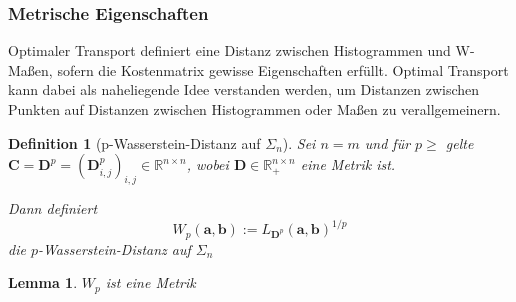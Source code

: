 \documentclass[11pt,a4paper]{article}
\newtheorem{lemma}[theorem]{Lemma}
\newtheorem{definition}[theorem]{Definition}
\numberwithin{equation}{section}
\begin{document}
	
	\subsubsection{Metrische Eigenschaften}
	Optimaler Transport definiert eine Distanz zwischen Histogrammen und W-Maßen, sofern die Kostenmatrix gewisse Eigenschaften erfüllt. Optimal Transport kann dabei als naheliegende Idee verstanden werden, um Distanzen zwischen Punkten auf Distanzen zwischen Histogrammen oder Maßen zu verallgemeinern.
	
	\begin{definition}[p-Wasserstein-Distanz auf $\Sigma_n$]
		Sei $n=m$ und für $p \geq$ gelte $\boldsymbol{C} = \boldsymbol{D}^p = (\boldsymbol{D}_{i,j}^p)_{i,j} \in \mathbb{R}^{n \times n}$, wobei $\boldsymbol{D} \in \mathbb{R}_+^{n \times n}$ eine Metrik ist.
		
		Dann definiert 
		\begin{equation}
		W_p(\boldsymbol{a}, \boldsymbol{b}) := L_{\boldsymbol{D}^p} (\boldsymbol{a}, \boldsymbol{b})^{1/p}
		\end{equation} 
		die $p$-Wasserstein-Distanz auf $\Sigma_n$
	\end{definition}
	
	\begin{lemma}
		$W_p$ ist eine Metrik
	\end{lemma}
	
\end{document}
